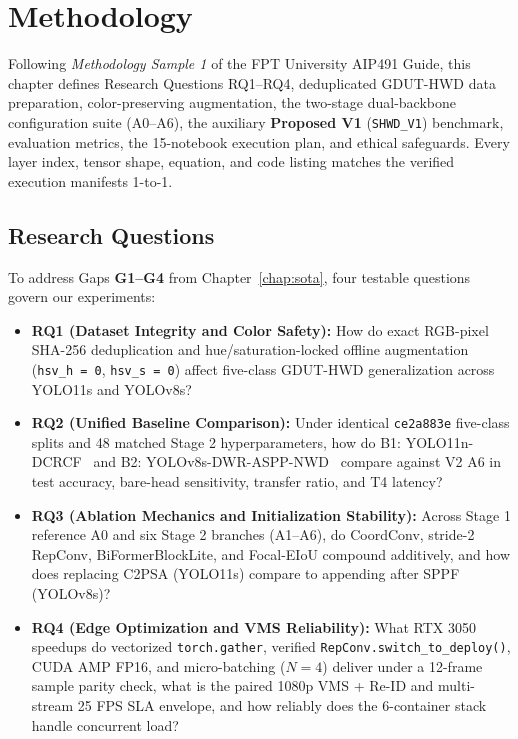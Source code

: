 \chapter{Methodology}
\label{chap:methodology}

Following \textit{Methodology Sample 1} of the FPT University AIP491 Guide, this chapter defines Research Questions RQ1--RQ4, deduplicated GDUT-HWD data preparation, color-preserving augmentation, the two-stage dual-backbone configuration suite (A0--A6), the auxiliary \textbf{Proposed V1} (\texttt{SHWD\_V1}) benchmark, evaluation metrics, the 15-notebook execution plan, and ethical safeguards. Every layer index, tensor shape, equation, and code listing matches the verified execution manifests 1-to-1.

\section{Research Questions}

To address Gaps \textbf{G1--G4} from Chapter~\ref{chap:sota}, four testable questions govern our experiments:
\begin{itemize}[leftmargin=1.8em, itemsep=2.5pt]
  \item \textbf{RQ1 (Dataset Integrity and Color Safety):} How do exact RGB-pixel SHA-256 deduplication and hue/saturation-locked offline augmentation (\texttt{hsv\_h = 0}, \texttt{hsv\_s = 0}) affect five-class GDUT-HWD generalization across YOLO11s and YOLOv8s?
  \item \textbf{RQ2 (Unified Baseline Comparison):} Under identical \texttt{ce2a883e} five-class splits and 48 matched Stage 2 hyperparameters, how do B1: YOLO11n-DCRCF~\cite{zhao2025yolodcrcf} and B2: YOLOv8s-DWR-ASPP-NWD~\cite{song2024improved} compare against V2 A6 in test accuracy, bare-head sensitivity, transfer ratio, and T4 latency?
  \item \textbf{RQ3 (Ablation Mechanics and Initialization Stability):} Across Stage 1 reference A0 and six Stage 2 branches (A1--A6), do CoordConv, stride-2 RepConv, BiFormerBlockLite, and Focal-EIoU compound additively, and how does replacing C2PSA (YOLO11s) compare to appending after SPPF (YOLOv8s)?
  \item \textbf{RQ4 (Edge Optimization and VMS Reliability):} What RTX 3050 speedups do vectorized \texttt{torch.gather}, verified \nolinkurl{RepConv.switch_to_deploy()}, CUDA AMP FP16, and micro-batching ($N=4$) deliver under a 12-frame sample parity check, what is the paired 1080p VMS + Re-ID and multi-stream 25 FPS SLA envelope, and how reliably does the 6-container stack handle concurrent load?
\end{itemize}

